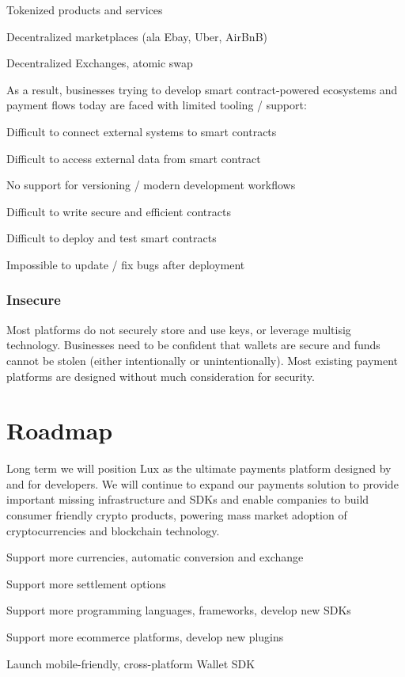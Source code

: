 \documentclass[11pt]{article}
\begin{document}
Tokenized products and services


Decentralized marketplaces (ala Ebay, Uber, AirBnB)


Decentralized Exchanges, atomic swap


As a result, businesses trying to develop smart contract-powered ecosystems and payment flows today are faced with limited tooling / support:


Difficult to connect external systems to smart contracts


Difficult to access external data from smart contract


No support for versioning / modern development workflows


Difficult to write secure and efficient contracts


Difficult to deploy and test smart contracts


Impossible to update / fix bugs after deployment


\subsubsection{Insecure}

Most platforms do not securely store and use keys, or leverage multisig technology. Businesses need to be confident that wallets are secure and funds cannot be stolen (either intentionally or unintentionally). Most existing payment platforms are designed without much consideration for security.


\section{Roadmap}

Long term we will position Lux as the ultimate payments platform designed by and for developers. We will continue to expand our payments solution to provide important missing infrastructure and SDKs and enable companies to build consumer friendly crypto products, powering mass market adoption of cryptocurrencies and blockchain technology.


Support more currencies, automatic conversion and exchange


Support more settlement options


Support more programming languages, frameworks, develop new SDKs


Support more ecommerce platforms, develop new plugins


Launch mobile-friendly, cross-platform Wallet SDK
\end{document}
